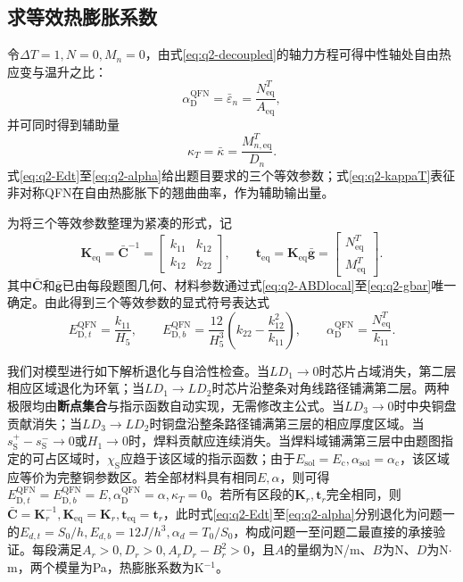 \documentclass[draft,12pt,a4paper]{ctexart}
\theoremstyle{definition}
\begin{document}
\subsection{求等效热膨胀系数}

令$\Delta T=1,N=0,M_n=0$，由式\eqref{eq:q2-decoupled}的轴力方程可得中性轴处自由热应变与温升之比：
\begin{equation}\label{eq:q2-alpha}
\alpha_{\mathrm D}^{\mathrm{QFN}}
=\bar\varepsilon_n
=\frac{N_{\mathrm{eq}}^T}{A_{\mathrm{eq}}},
\end{equation}
并可同时得到辅助量
\begin{equation}\label{eq:q2-kappaT}
\kappa_T
=\bar\kappa
=\frac{M_{n,\mathrm{eq}}^T}{D_n}.
\end{equation}
式\eqref{eq:q2-Edt}至\eqref{eq:q2-alpha}给出题目要求的三个等效参数；式\eqref{eq:q2-kappaT}表征非对称QFN在自由热膨胀下的翘曲曲率，作为辅助输出量。

为将三个等效参数整理为紧凑的形式，记
\begin{equation}\label{eq:q2-kmatrix}
\mathbf K_{\mathrm{eq}}
=\bar{\mathbf C}^{-1}
=\begin{bmatrix}k_{11}&k_{12}\\k_{12}&k_{22}\end{bmatrix},
\qquad
\mathbf t_{\mathrm{eq}}=\mathbf K_{\mathrm{eq}}\bar{\mathbf g}
=\begin{bmatrix}N_{\mathrm{eq}}^T\\M_{\mathrm{eq}}^T\end{bmatrix}.
\end{equation}
其中$\bar{\mathbf C}$和$\bar{\mathbf g}$已由每段题图几何、材料参数通过式\eqref{eq:q2-ABDlocal}至\eqref{eq:q2-gbar}唯一确定。由此得到三个等效参数的显式符号表达式
\begin{equation}\label{eq:q2-final}
E_{\mathrm D,t}^{\mathrm{QFN}}=\frac{k_{11}}{H_5},\qquad
E_{\mathrm D,b}^{\mathrm{QFN}}
=\frac{12}{H_5^3}\left(k_{22}-\frac{k_{12}^2}{k_{11}}\right),\qquad
\alpha_{\mathrm D}^{\mathrm{QFN}}=\frac{N_{\mathrm{eq}}^T}{k_{11}}.
\end{equation}


我们对模型进行如下解析退化与自洽性检查。当$LD_1\to0$时芯片占域消失，第二层相应区域退化为环氧；当$LD_1\to LD_2$时芯片沿整条对角线路径铺满第二层。两种极限均由\textbf{断点集合}与指示函数自动实现，无需修改主公式。当$LD_3\to0$时中央铜盘贡献消失；当$LD_3\to LD_2$时铜盘沿整条路径铺满第三层的相应厚度区域。当$s_{\mathrm S}^+-s_{\mathrm S}^-\to0$或$H_1\to0$时，焊料贡献应连续消失。当焊料域铺满第三层中由题图指定的可占区域时，$\chi_{\mathrm S}$应趋于该区域的指示函数；由于$E_{\mathrm{sol}}=E_{\mathrm c},\alpha_{\mathrm{sol}}=\alpha_{\mathrm c}$，该区域应等价为完整铜参数区。若全部材料具有相同$E,\alpha$，则可得$E_{\mathrm D,t}^{\mathrm{QFN}}=E_{\mathrm D,b}^{\mathrm{QFN}}=E,\alpha_{\mathrm D}^{\mathrm{QFN}}=\alpha,\kappa_T=0$。若所有区段的$\mathbf K_r,\mathbf t_r$完全相同，则$\bar{\mathbf C}=\mathbf K_r^{-1},\mathbf K_{\mathrm{eq}}=\mathbf K_r,\mathbf t_{\mathrm{eq}}=\mathbf t_r$，此时式\eqref{eq:q2-Edt}至\eqref{eq:q2-alpha}分别退化为问题一的$E_{d,t}=S_0/h,E_{d,b}=12J/h^3,\alpha_d=T_0/S_0$，构成问题一至问题二最直接的承接验证。每段满足$A_r>0,D_r>0,A_rD_r-B_r^2>0$，且$A$的量纲为N/m、$B$为N、$D$为N$\cdot$m，两个模量为Pa，热膨胀系数为K$^{-1}$。
\end{document}
